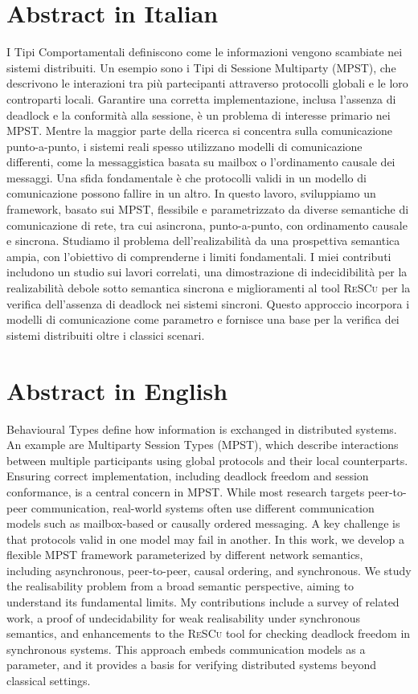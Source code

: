 \documentclass[12pt,a4paper,twoside]{book}
\theoremstyle{definition}
\theoremstyle{definition}
\theoremstyle{definition}
\begin{document}
\chapter*{Abstract in Italian}
I Tipi Comportamentali definiscono come le informazioni vengono scambiate nei
sistemi distribuiti. Un esempio sono i Tipi di Sessione Multiparty (MPST),
che descrivono le interazioni tra più partecipanti attraverso protocolli globali
e le loro controparti locali. Garantire una corretta implementazione, inclusa
l’assenza di deadlock e la conformità alla sessione, è un problema di interesse
primario nei MPST.  
Mentre la maggior parte della ricerca si concentra sulla comunicazione
punto-a-punto, i sistemi reali spesso utilizzano modelli di comunicazione
differenti, come la messaggistica basata su mailbox o l’ordinamento
causale dei messaggi. Una sfida fondamentale è che protocolli validi in un
modello di comunicazione possono fallire in un altro.  
In questo lavoro, sviluppiamo un framework, basato sui MPST,
flessibile e parametrizzato da diverse
semantiche di comunicazione di rete, tra cui asincrona, punto-a-punto, con ordinamento
causale e sincrona. Studiamo il problema dell’realizabilità da una
prospettiva semantica ampia, con l’obiettivo di comprenderne i limiti
fondamentali. I miei contributi includono un studio sui lavori correlati, una
dimostrazione di indecidibilità per la realizabilità debole sotto semantica
sincrona e miglioramenti al tool \textsc{ReSCu} per la verifica
dell’assenza di deadlock nei sistemi sincroni.  
Questo approccio incorpora i modelli di comunicazione come parametro e fornisce
una base per la verifica dei sistemi distribuiti oltre i classici scenari. 
\thispagestyle{plain}
\topmargin=-1cm
\cleardoublepage

{}
\chapter*{Abstract in English}
Behavioural Types define how information is exchanged in distributed systems.
An example are Multiparty Session Types (MPST), which describe interactions between 
multiple participants
using global protocols and their local counterparts. Ensuring correct implementation,
including deadlock freedom and session conformance, is a central concern in MPST.
While most research targets peer-to-peer communication, real-world systems often
use different communication models such as mailbox-based or causally ordered messaging.
A key challenge is that protocols valid in one model may fail in another.
In this work, we develop a flexible MPST framework parameterized by different network
semantics, including asynchronous, peer-to-peer, causal ordering, and synchronous.
We study the realisability problem from a broad semantic perspective, aiming to
understand its fundamental limits. My contributions include a survey
of related work, a proof of undecidability for weak realisability under synchronous
semantics, and enhancements to the \textsc{ReSCu} tool for checking deadlock freedom in
synchronous systems. This approach embeds communication models as a parameter, and it
provides a basis for verifying distributed systems beyond classical settings.
\end{document}

